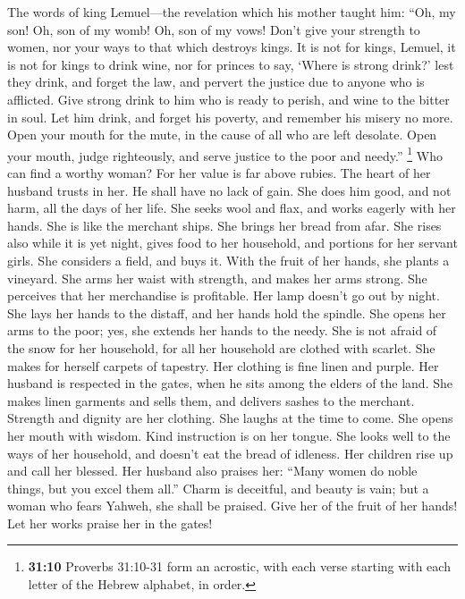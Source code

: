  The words of king Lemuel---the revelation which his
mother taught him:  ``Oh, my son! Oh, son of my womb! Oh,
son of my vows!  Don't give your strength to women, nor
your ways to that which destroys kings.  It is not for
kings, Lemuel, it is not for kings to drink wine, nor for princes to
say, `Where is strong drink?'  lest they drink, and forget
the law, and pervert the justice due to anyone who is afflicted.
 Give strong drink to him who is ready to perish, and wine
to the bitter in soul.  Let him drink, and forget his
poverty, and remember his misery no more.  Open your mouth
for the mute, in the cause of all who are left desolate. 
Open your mouth, judge righteously, and serve justice to the poor and
needy.''  \footnote{\textbf{31:10} Proverbs 31:10-31 form
  an acrostic, with each verse starting with each letter of the Hebrew
  alphabet, in order.} Who can find a worthy woman? For her value is far
above rubies.  The heart of her husband trusts in her. He
shall have no lack of gain.  She does him good, and not
harm, all the days of her life.  She seeks wool and flax,
and works eagerly with her hands.  She is like the
merchant ships. She brings her bread from afar.  She
rises also while it is yet night, gives food to her household, and
portions for her servant girls.  She considers a field,
and buys it. With the fruit of her hands, she plants a vineyard.
 She arms her waist with strength, and makes her arms
strong.  She perceives that her merchandise is
profitable. Her lamp doesn't go out by night.  She lays
her hands to the distaff, and her hands hold the spindle.
 She opens her arms to the poor; yes, she extends her
hands to the needy.  She is not afraid of the snow for
her household, for all her household are clothed with scarlet.
 She makes for herself carpets of tapestry. Her clothing
is fine linen and purple.  Her husband is respected in
the gates, when he sits among the elders of the land. 
She makes linen garments and sells them, and delivers sashes to the
merchant.  Strength and dignity are her clothing. She
laughs at the time to come.  She opens her mouth with
wisdom. Kind instruction is on her tongue.  She looks
well to the ways of her household, and doesn't eat the bread of
idleness.  Her children rise up and call her blessed. Her
husband also praises her:  ``Many women do noble things,
but you excel them all.''  Charm is deceitful, and beauty
is vain; but a woman who fears Yahweh, she shall be praised.
 Give her of the fruit of her hands! Let her works praise
her in the gates!

